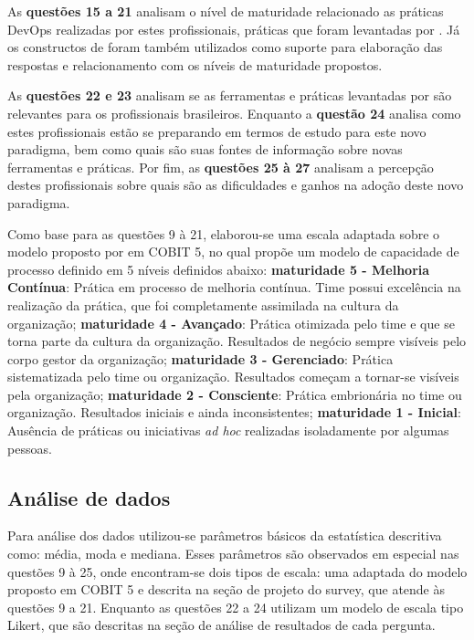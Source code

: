 \documentclass[twoside,english,brazilian]{UNISINOSartigo}
\begin{document}
As \textbf{questões 15 a 21} analisam o nível de maturidade relacionado as práticas DevOps realizadas por estes profissionais, práticas que foram levantadas por . Já os constructos  de  foram também utilizados como suporte para elaboração das respostas e relacionamento com os níveis de maturidade propostos.

As \textbf{questões 22 e 23} analisam se as ferramentas e práticas levantadas por  são relevantes para os profissionais brasileiros.
Enquanto a \textbf{questão 24} analisa como estes profissionais estão se preparando em termos de estudo para este novo paradigma, bem como quais são suas fontes de informação sobre novas ferramentas e práticas. Por fim, as \textbf{questões 25 à 27} analisam a percepção destes profissionais sobre quais são as dificuldades e ganhos na adoção deste novo paradigma.

 Como base para as questões 9 à 21, elaborou-se uma escala adaptada sobre o modelo proposto por  em COBIT 5, no qual propõe um modelo de capacidade de processo definido em 5 níveis definidos abaixo: \textbf{maturidade 5 - Melhoria Contínua}: Prática em processo de melhoria contínua. Time possui excelência na realização da prática, que foi completamente assimilada na cultura da organização; \textbf{maturidade 4 - Avançado}: Prática otimizada pelo time e que se torna parte da cultura da organização. Resultados de negócio sempre visíveis pelo corpo gestor da organização; \textbf{maturidade 3 - Gerenciado}: Prática sistematizada pelo time ou organização. Resultados começam a tornar-se visíveis pela organização; \textbf{maturidade 2 - Consciente}: Prática embrionária no time ou organização. Resultados iniciais e ainda inconsistentes; \textbf{maturidade 1 - Inicial}: Ausência de práticas ou iniciativas \textit{ad hoc} realizadas isoladamente por algumas pessoas.

 \subsection{Análise de dados}
Para análise dos dados utilizou-se parâmetros básicos da estatística descritiva como: média, moda e mediana. Esses parâmetros são observados em especial nas questões 9 à 25, onde encontram-se dois tipos de escala: uma adaptada do modelo proposto em COBIT 5 e descrita na seção de projeto do survey, que atende às questões 9 a 21. Enquanto as questões 22 a 24 utilizam um modelo de escala tipo Likert, que são descritas na seção de análise de resultados de cada pergunta.
\end{document}
